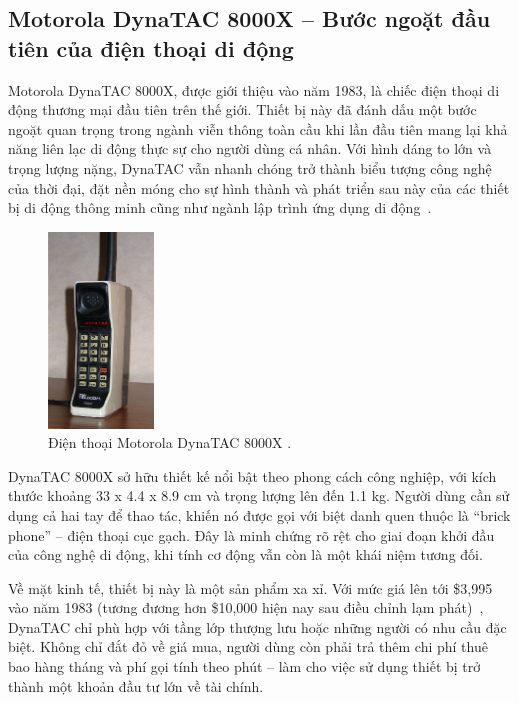 \subsection{Motorola DynaTAC 8000X – Bước ngoặt đầu tiên của điện thoại di động}
\renewcommand{\labelitemi}{--}    

    \hspace*{0.8cm}Motorola DynaTAC 8000X, được giới thiệu vào năm 1983, là chiếc điện thoại di động thương mại đầu tiên trên thế giới. Thiết bị này đã đánh dấu một bước ngoặt quan trọng trong ngành viễn thông toàn cầu khi lần đầu tiên mang lại khả năng liên lạc di động thực sự cho người dùng cá nhân. Với hình dáng to lớn và trọng lượng nặng, DynaTAC vẫn nhanh chóng trở thành biểu tượng công nghệ của thời đại, đặt nền móng cho sự hình thành và phát triển sau này của các thiết bị di động thông minh cũng như ngành lập trình ứng dụng di động~\cite{motorola1983}.


\begin{figure}[H]
  \centering
  \includegraphics[width=0.25\textwidth]{images/DynaTAC8000X.png}
  \caption{Điện thoại Motorola DynaTAC 8000X \cite{wikiDynaTAC}.}
  \label{fig:fig4}
\end{figure}


  \hspace*{0.8cm}DynaTAC 8000X sở hữu thiết kế nổi bật theo phong cách công nghiệp, với kích thước khoảng 33 x 4.4 x 8.9 cm và trọng lượng lên đến 1.1 kg. Người dùng cần sử dụng cả hai tay để thao tác, khiến nó được gọi với biệt danh quen thuộc là “brick phone” – điện thoại cục gạch. Đây là minh chứng rõ rệt cho giai đoạn khởi đầu của công nghệ di động, khi tính cơ động vẫn còn là một khái niệm tương đối.

  \vspace{0.5em}

  \hspace*{0.8cm}Về mặt kinh tế, thiết bị này là một sản phẩm xa xỉ. Với mức giá lên tới \$3,995 vào năm 1983 (tương đương hơn \$10,000 hiện nay sau điều chỉnh lạm phát)~\cite{dynatacprice}, DynaTAC chỉ phù hợp với tầng lớp thượng lưu hoặc những người có nhu cầu đặc biệt. Không chỉ đắt đỏ về giá mua, người dùng còn phải trả thêm chi phí thuê bao hàng tháng và phí gọi tính theo phút – làm cho việc sử dụng thiết bị trở thành một khoản đầu tư lớn về tài chính.
  
